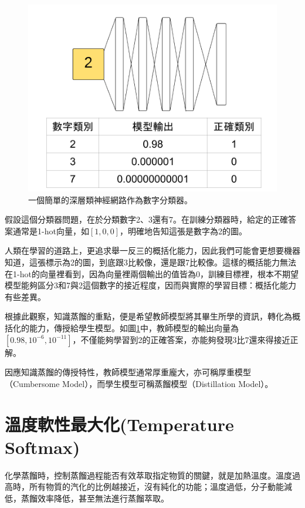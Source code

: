 \begin{figure}[!h]
\centering
\includegraphics[scale=0.30]{images/chap5_digit_classifier_example.png}
\caption{一個簡單的深層類神經網路作為數字分類器。}
\label{fig:chap5_digit_classifier_example}
\end{figure}

假設這個分類器問題，在於分類數字2、3還有7。在訓練分類器時，給定的正確答案通常是1-hot向量，如$[1, 0, 0]$，明確地告知這張是數字為2的圖。

人類在學習的道路上，更追求舉一反三的概括化能力，因此我們可能會更想要機器知道，這張標示為2的圖，到底跟3比較像，還是跟7比較像。這樣的概括能力無法在1-hot的向量裡看到，因為向量裡兩個輸出的值皆為0，訓練目標裡，根本不期望模型能夠區分3和7與2這個數字的接近程度，因而與實際的學習目標：概括化能力有些差異。

根據此觀察，知識蒸餾的重點，便是希望教師模型將其畢生所學的資訊，轉化為概括化的能力，傳授給學生模型。如圖\ref{fig:chap5_digit_classifier_example}中，教師模型的輸出向量為$[0.98 , 10^{-6} , 10^{-11}]$，不僅能夠學習到2的正確答案，亦能夠發現3比7還來得接近正解。

因應知識蒸餾的傳授特性，教師模型通常厚重龐大，亦可稱厚重模型（Cumbersome Model），而學生模型可稱蒸餾模型（Distillation Model）。

\section{溫度軟性最大化(Temperature Softmax)}

化學蒸餾時，控制蒸餾過程能否有效萃取指定物質的關鍵，就是加熱溫度。溫度過高時，所有物質的汽化的比例越接近，沒有純化的功能；溫度過低，分子動能減低，蒸餾效率降低，甚至無法進行蒸餾萃取。

